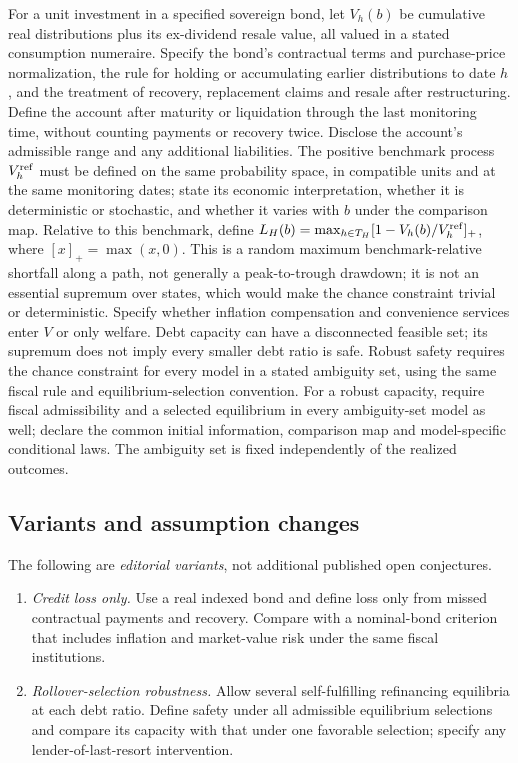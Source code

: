 \documentclass[11pt,a4paper]{article}
\begin{document}
For a unit investment in a specified sovereign bond, let \(V_h(b)\) be cumulative real distributions plus its ex-dividend resale value, all valued in a stated consumption numeraire. Specify the bond's contractual terms and purchase-price normalization, the rule for holding or accumulating earlier distributions to date \(h\), and the treatment of recovery, replacement claims and resale after restructuring. Define the account after maturity or liquidation through the last monitoring time, without counting payments or recovery twice. Disclose the account's admissible range and any additional liabilities. The positive benchmark process \(V_h^{\rm ref}\) must be defined on the same probability space, in compatible units and at the same monitoring dates; state its economic interpretation, whether it is deterministic or stochastic, and whether it varies with \(b\) under the comparison map. Relative to this benchmark, define \(L_H(b)=\max_{h\in T_H}[1-V_h(b)/V_h^{\rm ref}]_+\), where \([x]_+=\max(x,0)\). This is a random maximum benchmark-relative shortfall along a path, not generally a peak-to-trough drawdown; it is not an essential supremum over states, which would make the chance constraint trivial or deterministic. Specify whether inflation compensation and convenience services enter \(V\) or only welfare. Debt capacity can have a disconnected feasible set; its supremum does not imply every smaller debt ratio is safe. Robust safety requires the chance constraint for every model in a stated ambiguity set, using the same fiscal rule and equilibrium-selection convention. For a robust capacity, require fiscal admissibility and a selected equilibrium in every ambiguity-set model as well; declare the common initial information, comparison map and model-specific conditional laws. The ambiguity set is fixed independently of the realized outcomes.
\subsection*{Variants and assumption changes}
The following are \emph{editorial variants}, not additional published open conjectures.
\begin{enumerate}
\item \emph{Credit loss only.} Use a real indexed bond and define loss only from missed contractual payments and recovery. Compare with a nominal-bond criterion that includes inflation and market-value risk under the same fiscal institutions.
\item \emph{Rollover-selection robustness.} Allow several self-fulfilling refinancing equilibria at each debt ratio. Define safety under all admissible equilibrium selections and compare its capacity with that under one favorable selection; specify any lender-of-last-resort intervention.
\end{enumerate}
\end{document}
